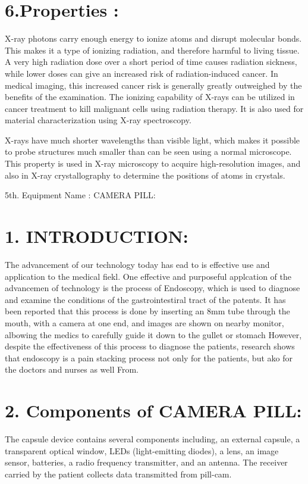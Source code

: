 \documentclass[12pt]{article}
\begin{document}
\section*{6.Properties :}
X-ray photons carry enough energy to ionize atoms and disrupt molecular bonds. This makes it a type of ionizing radiation, and therefore harmful to living tissue. A very high radiation dose over a short period of time causes radiation sickness, while lower doses can give an increased risk of radiation-induced cancer. In medical imaging, this increased cancer risk is generally greatly outweighed by the benefits of the examination. The ionizing capability of X-rays can be utilized in cancer treatment to kill malignant cells using radiation therapy. It is also used for material characterization using X-ray spectroscopy.

X-rays have much shorter wavelengths than visible light, which makes it possible to probe structures much smaller than can be seen using a normal microscope. This property is used in X-ray microscopy to acquire high-resolution images, and also in X-ray crystallography to determine the positions of atoms in crystals.


\maketitle
\clearpage
5th.  Equipment Name :  CAMERA PILL:

\section*{1.  INTRODUCTION:}
The advancement of our technology today has ead to is effective use and application to the medical fiekl. One effective and purposeful applcation of the advancemen of technology is the process of Endoscopy, which is used to diagnose and examine the conditions of the gastrointestiral tract of the patents. It has been reported that this process is done by inserting an 8mm tube through the mouth, with a camera at one end, and images are shown on nearby monitor, albowing the medics to carefully guide it down to the gullet or stomach However, despite the effectiveness of this process to diagnose the patients, research shows that endoscopy is a pain stacking process not only for the patients, but ako for the doctors and nurses as well From.

\section*{2. Components of CAMERA PILL:}
   The capsule device contains several components including, an external capsule, a transparent optical window, LEDs (light-emitting diodes), a lens, an image sensor, batteries, a radio frequency transmitter, and an antenna. The receiver carried by the patient collects data transmitted from pill-cam.
\end{document}
